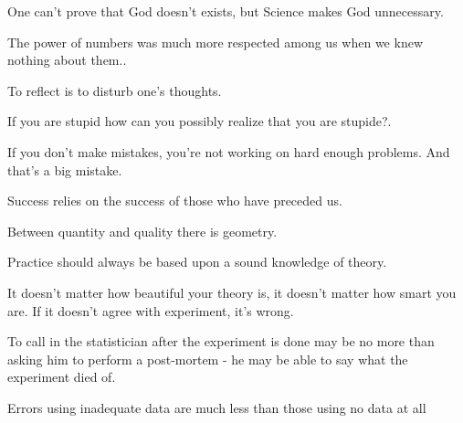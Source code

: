 \documentclass[12pt,a4paper,twoside,openright]{report}
\theoremstyle{definition}
\theoremstyle{itexmp}
\numberwithin{equation}{section}
\begin{document}
 	 \begin{fquote}One can't prove that God doesn't exists, but Science makes God unnecessary.
 	\end{fquote}

 	 \begin{fquote}[Voltaire]The power of numbers was much more respected among us when we knew nothing about them..
 	\end{fquote}

	\begin{fquote}To reflect is to disturb one's thoughts.
 	\end{fquote} 
 	
 	\begin{fquote}If you are stupid how can you possibly realize that you are stupide?.
 	\end{fquote} 	
 	
 	\begin{fquote}If you don't make mistakes, you're not working on hard enough problems. And that's a big mistake.
 	\end{fquote}

	\begin{fquote}[?]Success relies on the success of those who have preceded us.
 	\end{fquote}
 	
 	\begin{fquote}Between quantity and quality there is geometry.
 	\end{fquote}

	\begin{fquote}Practice should always be based upon a sound knowledge of theory.
 	\end{fquote}
 	
 	\begin{fquote}It doesn't matter how beautiful your theory is, it doesn't matter how smart you are. If it doesn't agree with experiment, it's wrong.
 	\end{fquote}
 	
 	\begin{fquote}To call in the statistician after the experiment is done may be no more than asking him to perform a post-mortem - he may be able to say what the experiment died of.
 	\end{fquote}
 	
 	\begin{fquote}Errors using inadequate data are much less than those using no data at all
 	\end{fquote}
 	
\end{document}
